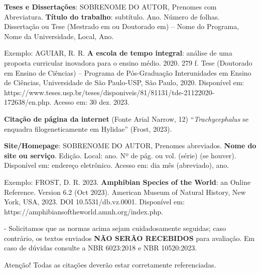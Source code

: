 \textbf{Teses e Dissertações}:
SOBRENOME DO AUTOR, Prenomes com Abreviatura. \textbf{Título do trabalho}: subtítulo. Ano. Número de folhas. Dissertação ou Tese (Mestrado em ou Doutorado em) – Nome do Programa, Nome da Universidade, Local, Ano.

Exemplo:
AGUIAR, R. R. \textbf{A escola de tempo integral}: análise de uma proposta curricular inovadora para o ensino médio. 2020. 279 f. Tese (Doutorado em Ensino de Ciências) – Programa de Pós-Graduação Interunidades em Ensino de Ciências, Universidade de São Paulo-USP, São Paulo, 2020. Disponível em: https://www.teses.usp.br/teses/disponiveis/81/81131/tde-21122020-172638/en.php. Acesso em: 30 dez. 2023.

\textbf{Citação de página da internet} (Fonte Arial Narrow, 12)
``\textit{Trachycephalus} se enquadra filogeneticamente em Hylidae'' (Frost, 2023).

\textbf{Site/Homepage}:
SOBRENOME DO AUTOR, Prenomes abreviados. \textbf{Nome do site ou serviço}. Edição. Local: ano. Nº de pág. ou vol. (série) (se houver). Disponível em: endereço eletrônico. Acesso em: dia mês (abreviado), ano.

Exemplo:
FROST, D. R. 2023. \textbf{Amphibian Species of the World}: an Online Reference. Version 6.2 (Oct 2023). American Museum of Natural History, New York, USA, 2023. DOI 10.5531/db.vz.0001. Disponível em: https://amphibiansoftheworld.amnh.org/index.php.

- Solicitamos que as normas acima sejam cuidadosamente seguidas; caso contrário, os textos enviados \textbf{NÃO SERÃO RECEBIDOS} para avaliação. Em caso de dúvidas consulte a NBR 6023:2018 e NBR 10520:2023.

Atenção! Todas as citações deverão estar corretamente referenciadas.
